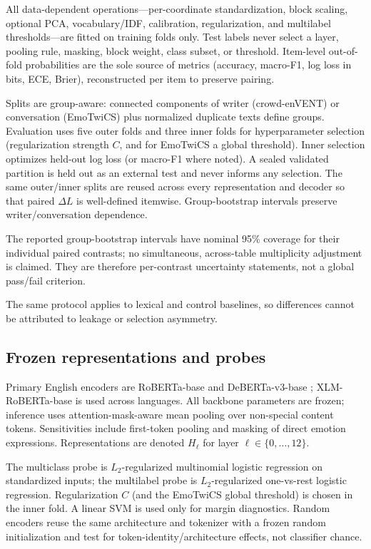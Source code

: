\documentclass[11pt]{article}
\begin{document}
All data-dependent operations---per-coordinate standardization, block scaling, optional PCA, vocabulary/IDF, calibration, regularization, and multilabel thresholds---are fitted on training folds only. Test labels never select a layer, pooling rule, masking, block weight, class subset, or threshold. Item-level out-of-fold probabilities are the sole source of metrics (accuracy, macro-F1, log loss in bits, ECE, Brier), reconstructed per item to preserve pairing.

Splits are group-aware: connected components of writer (crowd-enVENT) or conversation (EmoTwiCS) plus normalized duplicate texts define groups. Evaluation uses five outer folds and three inner folds for hyperparameter selection (regularization strength $C$, and for EmoTwiCS a global threshold). Inner selection optimizes held-out log loss (or macro-F1 where noted). A sealed validated partition is held out as an external test and never informs any selection. The same outer/inner splits are reused across every representation and decoder so that paired $\Delta L$ is well-defined itemwise. Group-bootstrap intervals preserve writer/conversation dependence.

The reported group-bootstrap intervals have nominal 95\% coverage for their individual paired contrasts; no simultaneous, across-table multiplicity adjustment is claimed. They are therefore per-contrast uncertainty statements, not a global pass/fail criterion.

The same protocol applies to lexical and control baselines, so differences cannot be attributed to leakage or selection asymmetry.

\subsection{Frozen representations and probes}

Primary English encoders are RoBERTa-base \citep{liu-etal-2019-roberta} and DeBERTa-v3-base \citep{he-etal-2021-debertav3}; XLM-RoBERTa-base \citep{conneau-etal-2020-unsupervised} is used across languages. All backbone parameters are frozen; inference uses attention-mask-aware mean pooling over non-special content tokens. Sensitivities include first-token pooling and masking of direct emotion expressions. Representations are denoted $H_{\ell}$ for layer $\ell\in\{0,\dots,12\}$.

The multiclass probe is $L_{2}$-regularized multinomial logistic regression on standardized inputs; the multilabel probe is $L_{2}$-regularized one-vs-rest logistic regression. Regularization $C$ (and the EmoTwiCS global threshold) is chosen in the inner fold. A linear SVM is used only for margin diagnostics. Random encoders reuse the same architecture and tokenizer with a frozen random initialization and test for token-identity/architecture effects, not classifier chance.
\end{document}
